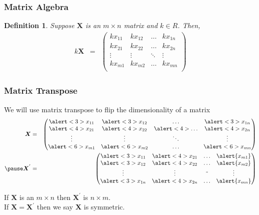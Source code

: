 \documentclass{beamer}
\newtheorem{defn}{Definition}
\numberwithin{equation}{section}
\begin{document}
\begin{frame}
\frametitle{Matrix Algebra} 
\begin{defn}
Suppose $\boldsymbol{X}$ is an $m \times n$ matrix and $k \in R$.  Then, 
\begin{eqnarray}
k \boldsymbol{X} & =&  \begin{pmatrix} 
k x_{11} & k x_{12} & \hdots &  k x_{1n} \\
k x_{21} & k x_{22} & \hdots & k x_{2n} \\
\vdots & \vdots & \ddots & \vdots \\
k x_{m1} & k x_{m2} & \hdots & k x_{mn} \\
\end{pmatrix}
\nonumber 
\end{eqnarray}

\end{defn}

\end{frame}



\begin{frame}
\frametitle{Matrix Transpose} 

We will use matrix transpose to flip the dimensionality of a matrix \pause \\

\begin{eqnarray}
\boldsymbol{X} & = & \begin{pmatrix} 
 \alert<3>{x_{11}} & \alert<3>{x_{12}} & \hdots & \alert<3>{x_{1n}} \\
\alert<4>{x_{21}} & \alert<4>{x_{22}} & \alert<4>{\hdots} & \alert<4>{x_{2n}} \\
\vdots & \vdots & \ddots & \vdots \\
\alert<6>{x_{m1}} & \alert<6>{x_{m2}} & \hdots & \alert<6>{x_{mn} } \\
\end{pmatrix}  \nonumber  \\
\pause
\boldsymbol{X}^{'} &  = &  \begin{pmatrix} 
\alert<3>{x_{11}} &  \alert<4>{x_{21} } & \hdots& \alert{x_{m1} } \\
\alert<3>{x_{12}} & \alert<4>{x_{22} } & \hdots &\alert{x_{m2} } \\
\vdots & \vdots & \ddot & \vdots\\
\alert<3>{x_{1n} } & \alert<4>{x_{2n}} &\hdots & \alert{x_{mn} }\\
\end{pmatrix} 
\nonumber 
\end{eqnarray}


If $\boldsymbol{X}$ is an $m \times n$ then $\boldsymbol{X}^{'} $ is $n \times m$.  \\
If $\boldsymbol{X} = \boldsymbol{X}^{'}$ then we say $\boldsymbol{X}$ is symmetric. 

\end{frame}
\end{document}
